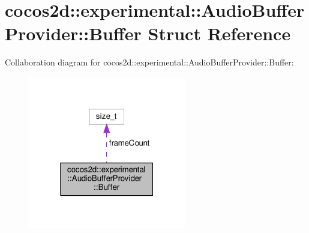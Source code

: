 \hypertarget{structcocos2d_1_1experimental_1_1AudioBufferProvider_1_1Buffer}{}\section{cocos2d\+:\+:experimental\+:\+:Audio\+Buffer\+Provider\+:\+:Buffer Struct Reference}
\label{structcocos2d_1_1experimental_1_1AudioBufferProvider_1_1Buffer}


Collaboration diagram for cocos2d\+:\+:experimental\+:\+:Audio\+Buffer\+Provider\+:\+:Buffer\+:
\nopagebreak
\begin{figure}[H]
\begin{center}
\leavevmode
\includegraphics[width=195pt]{structcocos2d_1_1experimental_1_1AudioBufferProvider_1_1Buffer__coll__graph}
\end{center}
\end{figure}
